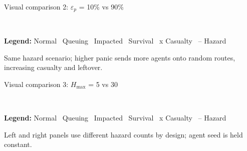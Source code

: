 \documentclass[aspectratio=169, xcolor=table]{beamer}
\newcommand{\simlegend}{\fontsize{6}{6.8}\selectfont
\textbf{Legend:}
\textcolor{statenormal}{\textbullet} Normal \,
\textcolor{statequeuing}{\textbullet} Queuing \,
\textcolor{stateimpacted}{\textbullet} Impacted \,
\textcolor{statesurvival}{\textbullet} Survival \,
\textcolor{statecasualty}{x} Casualty \,
\textcolor{highlightred}{-- Hazard}}
\begin{document}
\begin{frame}[t]{Visual comparison 2: $\varepsilon_p$ = 10\% vs 90\%}
\footnotesize

\begin{center}
\\[-0.2em]
{\parbox{0.72\linewidth}{\centering\simlegend}}
\end{center}

\vspace{0.3em}
\begin{center}
\parbox{0.82\linewidth}{\centering\scriptsize
Same hazard scenario; higher panic sends more agents onto random routes,\\
increasing casualty and leftover.}
\end{center}
\end{frame}

\begin{frame}[t]{Visual comparison 3: $H_{\max}$ = 5 vs 30}
\footnotesize

\begin{center}
\\[-0.2em]
{\parbox{0.72\linewidth}{\centering\simlegend}}
\end{center}

\vspace{0.3em}
\begin{center}
\parbox{0.82\linewidth}{\centering\scriptsize
Left and right panels use different hazard counts by design; agent seed is held constant.}
\end{center}
\end{frame}
\end{document}
